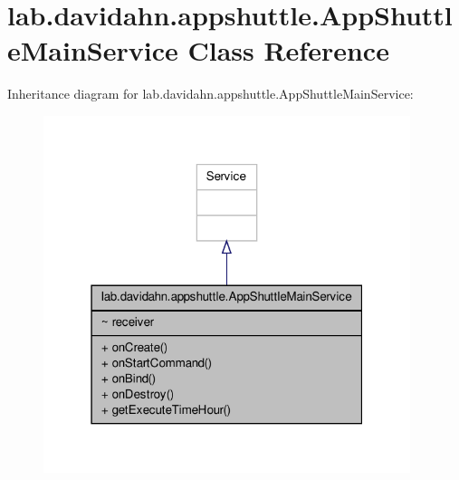 \hypertarget{classlab_1_1davidahn_1_1appshuttle_1_1_app_shuttle_main_service}{\section{lab.\-davidahn.\-appshuttle.\-App\-Shuttle\-Main\-Service \-Class \-Reference}
\label{classlab_1_1davidahn_1_1appshuttle_1_1_app_shuttle_main_service}
}


\-Inheritance diagram for lab.\-davidahn.\-appshuttle.\-App\-Shuttle\-Main\-Service\-:
\nopagebreak
\begin{figure}[H]
\begin{center}
\leavevmode
\includegraphics[width=304pt]{classlab_1_1davidahn_1_1appshuttle_1_1_app_shuttle_main_service__inherit__graph}
\end{center}
\end{figure}


